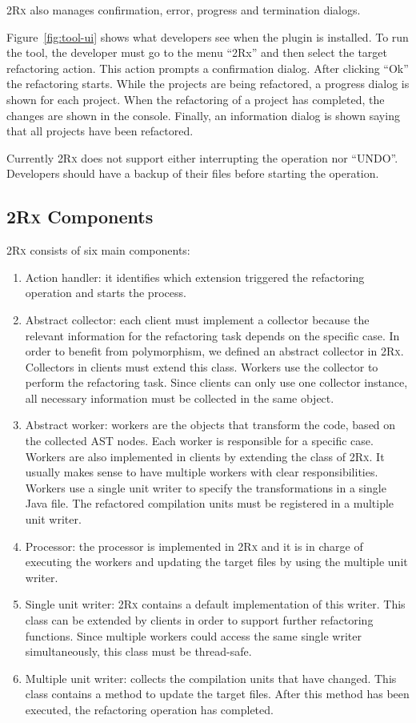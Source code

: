 \documentclass[type=bsc,accentcolor=tud9c]{tudthesis}
\newcommand{\framework}[1]{\textcolor{black!65}{#1}}
\newcommand{\toolcore}{\textsc{2Rx}}
\begin{document}
\toolcore{} also manages confirmation, error, progress and termination dialogs.

Figure~\ref{fig:tool-ui} shows what developers see when the plugin is installed. To run the tool, the developer must go to the menu ``2Rx'' and then select the target refactoring action. This action prompts a confirmation dialog. After clicking ``Ok'' the refactoring starts. While the projects are being refactored, a progress dialog is shown for each project. When the refactoring of a project has completed, the changes are shown in the console. Finally, an information dialog is shown saying that all projects have been refactored.

Currently \toolcore{} does not support either interrupting the operation nor ``UNDO''. Developers should have a backup of their files before starting the operation.

\subsection{\toolcore{} Components}
\label{sec:core-components}
\toolcore{} consists of six main components:
\begin{enumerate}
	\item Action handler: it identifies which extension triggered the refactoring operation and starts the process.
	\item Abstract collector: each client must implement a collector because the relevant information for the refactoring task depends on the specific case. In order to benefit from polymorphism, we defined an abstract collector in \toolcore{}. Collectors in clients must extend this class. Workers use the collector to perform the refactoring task. Since clients can only use one collector instance, all necessary information must be collected in the same object.
	\item Abstract worker: workers are the objects that transform the code, based on the collected AST nodes. Each worker is responsible for a specific case. Workers are also implemented in clients by extending the class  of \toolcore{}. It usually makes sense to have multiple workers with clear responsibilities. Workers use a single unit writer to specify the transformations in a single \framework{Java} file. The refactored compilation units must be registered in a multiple unit writer.
	\item Processor: the processor is implemented in \toolcore{} and it is in charge of executing the workers and updating the target files by using the multiple unit writer.
	\item Single unit writer: \toolcore{} contains a default implementation of this writer. This class can be extended by clients in order to support further refactoring functions. Since multiple workers could access the same single writer simultaneously, this class must be thread-safe.
	\item Multiple unit writer: collects the compilation units that have changed. This class contains a method to update the target files. After this method has been executed, the refactoring operation has completed.
\end{enumerate}
\end{document}

